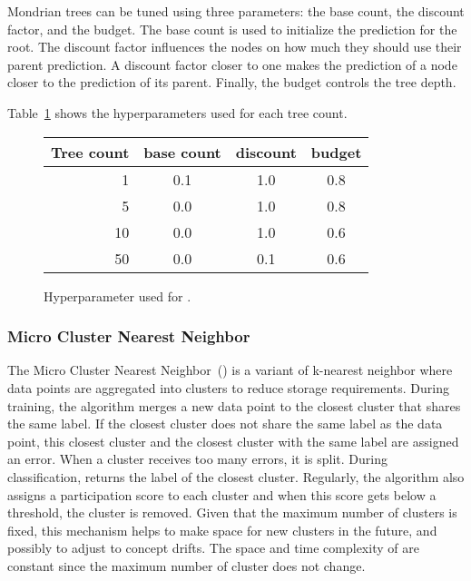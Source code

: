 Mondrian trees can be tuned using three
parameters: the base count, the discount factor,
and the budget. The base count is used to
initialize the prediction for the root. The
discount factor influences the nodes on how much
they should use their parent prediction. A
discount factor closer to one makes the prediction
of a node closer to the prediction of its parent.
Finally, the budget controls the tree depth.

Table~\ref{table:hyperparameter-mondrian} shows
the hyperparameters used for each tree count.
\begin{figure}
	\begin{center}
		\begin{tabular}{|| r | c | c | c ||} 
			\hline
			Tree count &  base count & discount & budget \\ [0.5ex] 
			\hline\hline
			1 & 0.1 & 1.0 & 0.8 \\
			5 & 0.0 & 1.0 & 0.8 \\
			10 & 0.0 & 1.0 & 0.6 \\
			50 & 0.0 & 0.1 & 0.6 \\
			\hline
		\end{tabular}
	\end{center}
	\caption{Hyperparameter used for \mondrianforest.}
		\label{table:hyperparameter-mondrian}
\end{figure}


\subsubsection{Micro Cluster Nearest Neighbor~\cite{mc-nn}}
The Micro Cluster Nearest Neighbor~(\mcnn) is a
variant of k-nearest neighbor where data points
are aggregated into clusters to reduce storage
requirements.  During training, the algorithm
merges a new data point to the closest cluster
that shares the same label. If the closest cluster
does not share the same label as the data point,
this closest cluster and the closest cluster with
the same label are assigned an error. When a
cluster receives too many errors, it is split.
During classification, \mcnn returns the label of
the closest cluster.  Regularly, the algorithm
also assigns a participation score to each cluster
and when this score gets below a threshold, the
cluster is removed. Given that the maximum number
of clusters is fixed, this mechanism helps to make
space for new clusters in the future, and possibly
to adjust to concept drifts.  
The space and time complexity of \mcnn are
constant since the maximum number of cluster does
not change.

